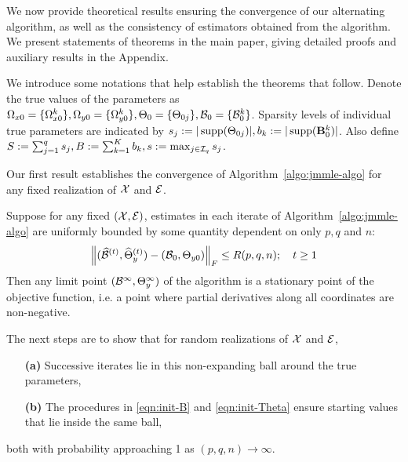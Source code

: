 We now provide theoretical results ensuring the convergence of our alternating algorithm, as well as the consistency of estimators obtained from the algorithm. We present statements of theorems in the main paper, giving detailed proofs and auxiliary results in the Appendix.

We introduce some notations that help establish the theorems that follow. Denote the true values of the parameters as $\Omega_{x 0} = \{ \Omega_{x 0}^k \}, \Omega_{y 0} = \{ \Omega_{y 0}^k \}, \Theta_0 = \{ \Theta_{0 j} \}, {\cal{B}}_0 = \{ {\cal{B}}_0^k \}$. Sparsity levels of individual true parameters are indicated by $s_j := | \operatorname*{supp} (\Theta_{0j})|, b_k := | \operatorname*{supp}({\mathbf{B}}^k_0) |$. Also define $S := \sum_{j=1}^q s_j, B:= \sum_{k=1}^K b_k, s:= \max_{j \in {\cal{I}}_q } s_j$. 

Our first result establishes the convergence of Algorithm~\ref{algo:jmmle-algo} for any fixed realization of ${\cal{X}}$ and ${\cal{E}}$.

\begin{Theorem}
Suppose for any fixed $({\cal{X}}, {\cal{E}})$, estimates in each iterate of Algorithm~\ref{algo:jmmle-algo} are uniformly bounded by some quantity dependent on only $p, q$ and $n$:
%
\begin{align}
\left\| (\widehat {{\cal{B}}}^{(t)}, \widehat \Theta_y^{(t)}) - ( {\cal{B}}_0, \Theta_{y 0}) \right\|_F
\leq R(p,q,n);
\quad t \geq 1
\end{align}
%
Then any limit point $({\cal{B}}^\infty, \Theta_y^\infty)$ of the algorithm is a stationary point of the objective function, i.e. a point where partial derivatives along all coordinates are non-negative.
\end{Theorem}

The next steps are to show that for random realizations of ${\cal{X}}$ and ${\cal{E}}$,
%
\begin{enumerate}

\item[{\bf (a)}] Successive iterates lie in this non-expanding ball around the true parameters,

\item[{\bf (b)}] The procedures in \eqref{eqn:init-B} and \eqref{eqn:init-Theta} ensure starting values that lie inside the same ball,
\end{enumerate}
%
both with probability approaching 1 as $(p,q,n) \rightarrow \infty$.


